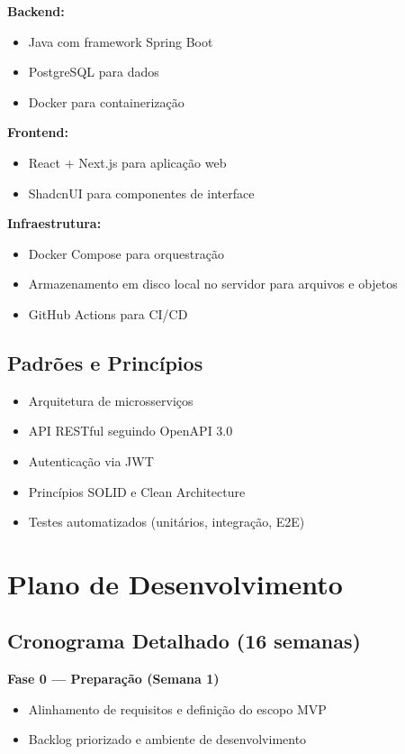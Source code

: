 \documentclass[12pt,a4paper]{article}
\begin{document}
\textbf{Backend:}
\begin{itemize}
    \item Java com framework Spring Boot
    \item PostgreSQL para dados
    \item Docker para containerização
\end{itemize}

\textbf{Frontend:}
\begin{itemize}
    \item React + Next.js para aplicação web
    \item ShadcnUI para componentes de interface
\end{itemize}

\textbf{Infraestrutura:}
\begin{itemize}
    \item Docker Compose para orquestração
    \item Armazenamento em disco local no servidor para arquivos e objetos
    \item GitHub Actions para CI/CD
\end{itemize}

\subsection{Padrões e Princípios}

\begin{itemize}
    \item Arquitetura de microsserviços
    \item API RESTful seguindo OpenAPI 3.0
    \item Autenticação via JWT
    \item Princípios SOLID e Clean Architecture
    \item Testes automatizados (unitários, integração, E2E)
\end{itemize}

\section{Plano de Desenvolvimento}
\label{sec:desenvolvimento}

\subsection{Cronograma Detalhado (16 semanas)}

\textbf{Fase 0 — Preparação (Semana 1)}
\begin{itemize}
    \item Alinhamento de requisitos e definição do escopo MVP
    \item Backlog priorizado e ambiente de desenvolvimento
\end{itemize}
\end{document}
